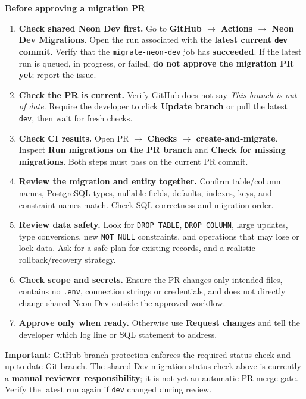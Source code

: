 \documentclass[10pt,a4paper]{article}
\begin{document}
\begin{tcolorbox}[breakable,colback=white,colframe=lightborder,boxrule=.7pt,arc=2mm]
\textbf{Before approving a migration PR}
\begin{enumerate}[leftmargin=21pt,itemsep=5pt]
  \item \textbf{Check shared Neon Dev first.} Go to \textbf{GitHub $\rightarrow$ Actions $\rightarrow$ Neon Dev Migrations}. Open the run associated with the \textbf{latest current \texttt{dev} commit}. Verify that the \texttt{migrate-neon-dev} job has \textbf{succeeded}. If the latest run is queued, in progress, or failed, \textbf{do not approve the migration PR yet}; report the issue.
  \item \textbf{Check the PR is current.} Verify GitHub does not say \emph{This branch is out of date}. Require the developer to click \textbf{Update branch} or pull the latest \texttt{dev}, then wait for fresh checks.
  \item \textbf{Check CI results.} Open PR $\rightarrow$ \textbf{Checks $\rightarrow$ create-and-migrate}. Inspect \textbf{Run migrations on the PR branch} and \textbf{Check for missing migrations}. Both steps must pass on the current PR commit.
  \item \textbf{Review the migration and entity together.} Confirm table/column names, PostgreSQL types, nullable fields, defaults, indexes, keys, and constraint names match. Check SQL correctness and migration order.
  \item \textbf{Review data safety.} Look for \texttt{DROP TABLE}, \texttt{DROP COLUMN}, large updates, type conversions, new \texttt{NOT NULL} constraints, and operations that may lose or lock data. Ask for a safe plan for existing records, and a realistic rollback/recovery strategy.
  \item \textbf{Check scope and secrets.} Ensure the PR changes only intended files, contains no \texttt{.env}, connection strings or credentials, and does not directly change shared Neon Dev outside the approved workflow.
  \item \textbf{Approve only when ready.} Otherwise use \textbf{Request changes} and tell the developer which log line or SQL statement to address.
\end{enumerate}
\end{tcolorbox}

\textbf{Important:} GitHub branch protection enforces the required status check and up-to-date Git branch. The shared Dev migration status check above is currently a \textbf{manual reviewer responsibility}; it is not yet an automatic PR merge gate. Verify the latest run again if \texttt{dev} changed during review.
\end{document}
